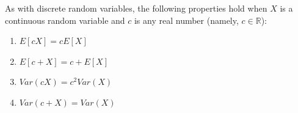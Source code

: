 \documentclass[notes=show,smaller,handout]{beamer}\usepackage[]{graphicx}\usepackage[]{color}
\renewcommand{\Pr}{P}
\newenvironment{stepenumerate}{\begin{enumerate}[<+->]}{\end{enumerate}}
\begin{document}
%
%
%
%
%
%
%


\begin{frame}{\secname}
As with discrete random variables, the following properties hold when $X$ is a
continuous random variable and $c$ is any real number (namely, $c \in \mathbb{R}$):
\bigskip

\begin{stepenumerate}
\item $E\left[ cX\right] =cE\left[ X\right] $ \\ \medskip

\item $E\left[ c+X\right] =c+E\left[ X\right] $ \\ \medskip

\item $Var\left( cX\right) =c^{2}Var\left( X\right) $ \\ \medskip

\item $Var\left( c+X\right) =Var\left( X\right) $
\end{stepenumerate}

\end{frame}%
\end{document}
